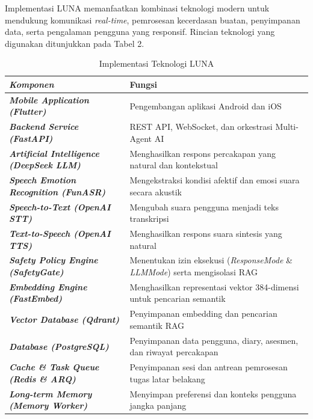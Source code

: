 
Implementasi LUNA memanfaatkan kombinasi teknologi modern untuk mendukung komunikasi \textit{real-time}, pemrosesan kecerdasan buatan, penyimpanan data, serta pengalaman pengguna yang responsif. Rincian teknologi yang digunakan ditunjukkan pada Tabel 2.

\begin{table}[H]
\centering
\renewcommand{\arraystretch}{1.35}
\renewcommand{\tabularxcolumn}[1]{m{#1}}
\caption{Implementasi Teknologi LUNA}
\vspace{0.3em}
\small
\begin{tabularx}{\textwidth}{| >{\bfseries\itshape}l | X |}
\hline
\rowcolor{TableHeaderPurple}
\color{white}\bfseries Komponen & \color{white}\bfseries Fungsi \\
\hline
Mobile Application (Flutter) & Pengembangan aplikasi Android dan iOS \\
\hline
\rowcolor{TableAltRowBg}
Backend Service (FastAPI) & REST API, WebSocket, dan orkestrasi Multi-Agent AI \\
\hline
Artificial Intelligence (DeepSeek LLM) & Menghasilkan respons percakapan yang natural dan kontekstual \\
\hline
\rowcolor{TableAltRowBg}
Speech Emotion Recognition (FunASR) & Mengekstraksi kondisi afektif dan emosi suara secara akustik \\
\hline
Speech-to-Text (OpenAI STT) & Mengubah suara pengguna menjadi teks transkripsi \\
\hline
\rowcolor{TableAltRowBg}
Text-to-Speech (OpenAI TTS) & Menghasilkan respons suara sintesis yang natural \\
\hline
Safety Policy Engine (SafetyGate) & Menentukan izin eksekusi (\textit{ResponseMode} \& \textit{LLMMode}) serta mengisolasi RAG \\
\hline
\rowcolor{TableAltRowBg}
Embedding Engine (FastEmbed) & Menghasilkan representasi vektor 384-dimensi untuk pencarian semantik \\
\hline
Vector Database (Qdrant) & Penyimpanan embedding dan pencarian semantik RAG \\
\hline
\rowcolor{TableAltRowBg}
Database (PostgreSQL) & Penyimpanan data pengguna, diary, asesmen, dan riwayat percakapan \\
\hline
Cache \& Task Queue (Redis \& ARQ) & Penyimpanan sesi dan antrean pemrosesan tugas latar belakang \\
\hline
\rowcolor{TableAltRowBg}
Long-term Memory (Memory Worker) & Menyimpan preferensi dan konteks pengguna jangka panjang \\
\hline
\end{tabularx}
\end{table}

